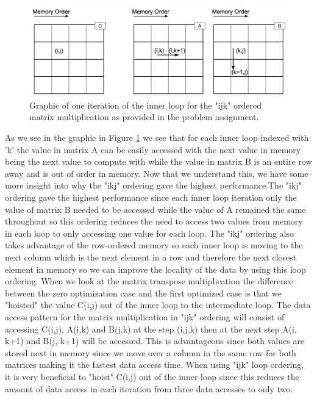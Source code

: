 \documentclass{article}
\begin{document}
\begin{figure}[H]
	\centering
	\label{fig:ijk}
	\includegraphics[width=0.7 \textwidth]{./ijk.png}	
	\caption{Graphic of one iteration of the inner loop for the "ijk" ordered matrix multiplication as provided in the problem assignment.}
\end{figure}


As we see in the graphic in Figure \ref{fig:ijk} we see that for each inner loop indexed with 'k' the value in matrix A can be easily accessed with the next value in memory being the next value to compute with while the value in matrix B is an entire row away and is out of order in memory. Now that we understand this, we have some more insight into why the "ikj" ordering gave the highest performance.The "ikj" ordering gave the highest performance since each inner loop iteration only the value of matrix B needed to be accessed while the value of A remained the same throughout so this ordering reduces the need to access two values from memory in each loop to only accessing one value for each loop. The "ikj" ordering also takes advantage of the row-ordered memory so each inner loop is moving to the next column which is the next element in a row and therefore the next closest element in memory so we can improve the locality of the data by using this loop ordering. When we look at the matrix transpose multiplication the difference between the zero optimization case and the first optimized case is that we "hoisted" the value C(i,j) out of the inner loop to the intermediate loop. The data access pattern for the matrix multiplication in "ijk" ordering will consist of accessing C(i,j), A(i,k) and B(j,k) at the step (i,j,k) then at the next step A(i, k+1) and B(j, k+1) will be accessed. This is advantageous since both values are stored next in memory since we move over a column in the same row for both matrices making it the fastest data access time.  When using "ijk" loop ordering, it is very beneficial to "hoist" C(i,j) out of the inner loop since this reduces the amount of data access in each iteration from three data accesses to only two. 
\end{document}
